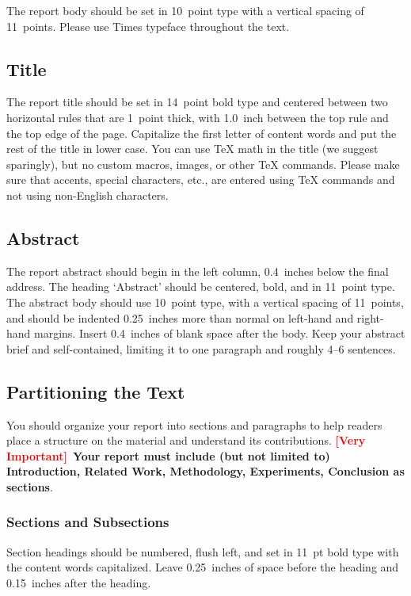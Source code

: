 \documentclass{article}
\theoremstyle{plain}
\theoremstyle{definition}
\theoremstyle{remark}
\begin{document}
The report body should be set in 10~point type with a vertical spacing
of 11~points. Please use Times typeface throughout the text.

\subsection{Title}

The report title should be set in 14~point bold type and centered
between two horizontal rules that are 1~point thick, with 1.0~inch
between the top rule and the top edge of the page. Capitalize the
first letter of content words and put the rest of the title in lower
case.
You can use TeX math in the title (we suggest sparingly),
but no custom macros, images, or other TeX commands.
Please make sure that accents, special characters, etc., are entered using
TeX commands and not using non-English characters.

\subsection{Abstract}

The report abstract should begin in the left column, 0.4~inches below the final
address. The heading `Abstract' should be centered, bold, and in 11~point type.
The abstract body should use 10~point type, with a vertical spacing of
11~points, and should be indented 0.25~inches more than normal on left-hand and
right-hand margins. Insert 0.4~inches of blank space after the body. Keep your
abstract brief and self-contained, limiting it to one paragraph and roughly 4--6
sentences.

\subsection{Partitioning the Text}

You should organize your report into sections and paragraphs to help readers
place a structure on the material and understand its contributions. \textbf{\textcolor{red}{[Very Important]}}~\textbf{Your report must include (but not limited to) Introduction, Related Work, Methodology, Experiments, Conclusion as sections}.

\subsubsection{Sections and Subsections}

Section headings should be numbered, flush left, and set in 11~pt bold type
with the content words capitalized. Leave 0.25~inches of space before the
heading and 0.15~inches after the heading.
\end{document}
